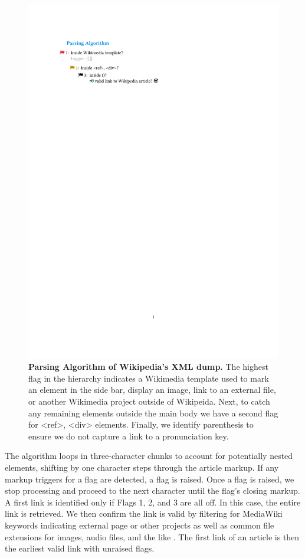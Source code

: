 \documentclass[pre,twocolumn,twoside,superscriptaddress,floatfix, aps, 10pt]{revtex4-1}
\begin{document}
\begin{figure}[tp!]
  \includegraphics[width=\columnwidth]{graphics/flags.pdf}  
  \caption{
    \textbf{Parsing Algorithm of Wikipedia's XML dump.}
The highest flag in the hierarchy indicates a Wikimedia template used to mark an element in the side bar, display an image, link to an external file, or another Wikimedia project outside of Wikipeida. Next, to catch any remaining elements outside the main body we have a second flag for <ref>, <div> elements. Finally, we identify parenthesis to ensure we do not capture a link to a pronunciation key.}
  \label{fig:parsing algorithm}
\end{figure}


The algorithm loops in three-character chunks to account for potentially nested elements, 
shifting by one character steps through the article markup.
If any markup triggers for a flag are detected, a flag is raised. 
Once a flag is raised, we stop processing and proceed to the next character
until the flag's closing markup.
A first link is identified only if Flags 1, 2, and 3 are all off.
In this case, the entire link is retrieved. 
We then confirm the link is valid by filtering for MediaWiki keywords indicating external page or other projects
as well as common file extensions for 
images, audio files, and the like 
\cite{media_wiki_templates}.
The first link of an article is then the earliest valid link with unraised flags.
\end{document}
